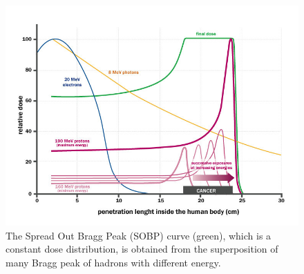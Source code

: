         \begin{figure}
            \centering
            \includegraphics[width=.7\linewidth]{figures/pixel_detectors_usage/Bragg-Peak.png}
            \caption{The Spread Out Bragg Peak (SOBP) curve (green), which is a constant dose distribution, is obtained from the superposition of many Bragg peak of hadrons with different energy.}
            \label{fig:Bragg-peak}
         \end{figure}


